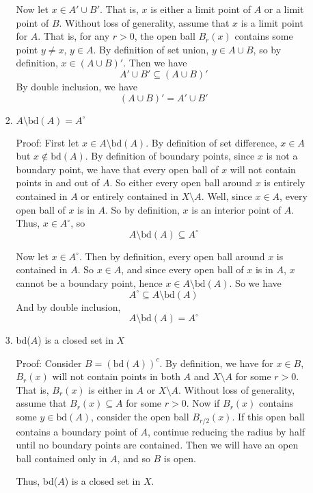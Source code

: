 \documentclass{article}
\begin{document}
\begin{enumerate}
\begin{enumerate}
\begin{enumerate}
            Now let $x \in A' \cup B'$. That is, $x$ is either a limit point of $A$ or a limit point of $B$. Without loss of generality, assume that $x$ is a limit point for $A$. That is, for any $r > 0$, the open ball $B_r(x)$ contains some point $y \neq x$, $y \in A$. By definition of set union, $y \in A \cup B$, so by definition, $x \in (A \cup B)'$. Then we have 
            \[A' \cup B' \subseteq (A \cup B)'\]
            By double inclusion, we have
            \[(A \cup B)' = A' \cup B'\]
            
            \item $A \setminus \text{bd}(A) = A^{\circ}$
            
            Proof: First let $x \in A \setminus \text{bd}(A)$. By definition of set difference, $x \in A$ but $x \notin \text{bd}(A)$. By definition of boundary points, since $x$ is not a boundary point, we have that every open ball of $x$ will not contain points in and out of $A$. So either every open ball around $x$ is entirely contained in $A$ or entirely contained in $X \setminus A$. Well, since $x \in A$, every open ball of $x$ is in $A$. So by definition, $x$ is an interior point of $A$. Thus, $x \in A^{\circ}$, so 
            \[A \setminus \text{bd}(A) \subseteq A^{\circ}\]
            
            Now let $x \in A^{\circ}$. Then by definition, every open ball around $x$ is contained in $A$. So $x \in A$, and since every open ball of $x$ is in $A$, $x$ cannot be a boundary point, hence $x \in A \setminus \text{bd}(A)$. So we have
            \[A^{\circ} \subseteq A \setminus \text{bd}(A)\]
            And by double inclusion,
            \[A \setminus \text{bd}(A) = A^{\circ}\]
            
            \item bd($A$) is a closed set in $X$
            
            Proof: Consider $B = (\text{bd}(A))^c$. By definition, we have for $x \in B$, $B_r(x)$ will not contain points in both $A$ and $X \setminus A$ for some $r > 0$. That is, $B_r(x)$ is either in $A$ or $X \setminus A$. Without loss of generality, assume that $B_r(x) \subseteq A$ for some $r > 0$. Now if $B_r(x)$ contains some $y \in \text{bd}(A)$, consider the open ball $B_{r/2}(x)$. If this open ball contains a boundary point of $A$, continue reducing the radius by half until no boundary points are contained. Then we will have an open ball contained only in $A$, and so $B$ is open. 
            
            Thus, bd($A$) is a closed set in $X$.
            

\end{enumerate}
\end{enumerate}
\end{enumerate}
\end{document}
